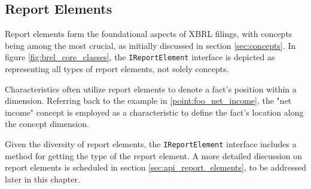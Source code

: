 

\subsection{Report Elements}

Report elements form the foundational aspects of XBRL filings, with concepts being among the most crucial, as initially discussed in section \ref{sec:concepts}.
In figure \ref{fig:brel_core_classes}, the \texttt{IReportElement} interface is depicted as representing all types of report elements, not solely concepts.

Characteristics often utilize report elements to denote a fact's position within a dimension.
Referring back to the example in \ref{point:foo_net_income}, the "net income" concept is employed as a characteristic to define the fact's location along the concept dimension.


Given the diversity of report elements, the \texttt{IReportElement} interface includes a method for getting the type of the report element.
A more detailed discussion on report elements is scheduled in section \ref{sec:api_report_elements}, to be addressed later in this chapter.

